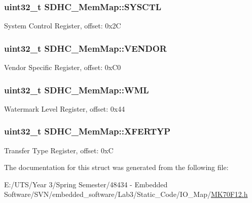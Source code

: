 \subsubsection[{S\+Y\+S\+C\+T\+L}]{\setlength{\rightskip}{0pt plus 5cm}uint32\+\_\+t S\+D\+H\+C\+\_\+\+Mem\+Map\+::\+S\+Y\+S\+C\+T\+L}\label{struct_s_d_h_c___mem_map_ae3204e728de4488f0b3569d1ebac78ae}
System Control Register, offset\+: 0x2\+C \hypertarget{struct_s_d_h_c___mem_map_ac3938ee338b7499c8b1cebed71604299}{}
\subsubsection[{V\+E\+N\+D\+O\+R}]{\setlength{\rightskip}{0pt plus 5cm}uint32\+\_\+t S\+D\+H\+C\+\_\+\+Mem\+Map\+::\+V\+E\+N\+D\+O\+R}\label{struct_s_d_h_c___mem_map_ac3938ee338b7499c8b1cebed71604299}
Vendor Specific Register, offset\+: 0x\+C0 \hypertarget{struct_s_d_h_c___mem_map_a8c1eb45065f5eb8878fc02701f2a6750}{}
\subsubsection[{W\+M\+L}]{\setlength{\rightskip}{0pt plus 5cm}uint32\+\_\+t S\+D\+H\+C\+\_\+\+Mem\+Map\+::\+W\+M\+L}\label{struct_s_d_h_c___mem_map_a8c1eb45065f5eb8878fc02701f2a6750}
Watermark Level Register, offset\+: 0x44 \hypertarget{struct_s_d_h_c___mem_map_ad6c008e044af83f7411e51258f111c48}{}
\subsubsection[{X\+F\+E\+R\+T\+Y\+P}]{\setlength{\rightskip}{0pt plus 5cm}uint32\+\_\+t S\+D\+H\+C\+\_\+\+Mem\+Map\+::\+X\+F\+E\+R\+T\+Y\+P}\label{struct_s_d_h_c___mem_map_ad6c008e044af83f7411e51258f111c48}
Transfer Type Register, offset\+: 0x\+C 

The documentation for this struct was generated from the following file\+:\begin{DoxyCompactItemize}
\item 
E\+:/\+U\+T\+S/\+Year 3/\+Spring Semester/48434 -\/ Embedded Software/\+S\+V\+N/embedded\+\_\+software/\+Lab3/\+Static\+\_\+\+Code/\+I\+O\+\_\+\+Map/\hyperlink{_m_k70_f12_8h}{M\+K70\+F12.\+h}\end{DoxyCompactItemize}
